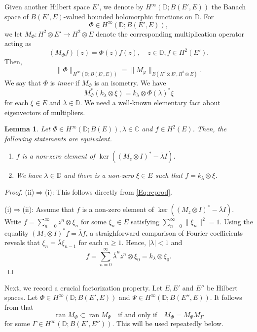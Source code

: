 \documentclass[10pt]{amsart}
\newcommand{\bC}{{\mathbb{C}}}
\newcommand{\bD}{{\mathbb{D}}}
\renewcommand{\phi}{\varphi}
\newcommand{\ol}{\overline}
\newcommand{\ran}{\operatorname{ran}}
\newtheorem{lemma}{Lemma}[section]
\theoremstyle{definition}
\begin{document}
Given another Hilbert space $E'$,  we denote by $H^\infty(\bD; B(E',E))$ the Banach space of $B(E',E)$-valued bounded holomorphic functions on $\bD$.  For $$\Phi\in H^\infty(\bD;B(E',E)),$$ we let $M_\Phi:H^2\otimes E'\to H^2 \otimes E$ denote the corresponding multiplication operator acting as
\[
(M_\Phi f)(z)=\Phi(z)f(z), \quad z\in \bD, f\in H^2(E').
\] 
Then, \[\|\Phi\|_{H^\infty(\bD;B(E',E))}=\|M_\phi\|_{B(H^2\otimes E',H^2\otimes E)}.\] We say that $\Phi$ is \emph{inner} if $M_\Phi$ is an isometry. We have
\begin{equation}\label{Eq:reprod}
M_\Phi^* (k_\lambda\otimes \xi)=k_\lambda \otimes \Phi(\lambda)^*\xi
\end{equation}
for each $ \xi\in E$ and $\lambda\in \bD$. We need a well-known elementary fact about eigenvectors of multipliers.

\begin{lemma}\label{L:eigenvector}
Let $\Phi\in H^\infty(\bD;B(E)),\lambda\in \bC$ and $f\in H^2(E)$. Then, the following statements are equivalent. 
\begin{enumerate}[{\rm (i)}]
\item $f$ is a non-zero element of $\ker ((M_z\otimes I)^*-\ol{\lambda}I)$.
\item We have $\lambda\in \bD$ and there is a non-zero $\xi\in E$ such that $f=k_\lambda\otimes \xi$.
\end{enumerate}
\end{lemma}
\begin{proof}
(ii)$\Rightarrow$(i): This follows directly from \eqref{Eq:reprod}. 

(i)$\Rightarrow$(ii): Assume that  $f$ is a non-zero element of $\ker ((M_z\otimes I)^*-\ol{\lambda}I)$. Write $f=\sum_{n=0}^\infty z^n \otimes \xi_n$ for some $\xi_n\in E$ satisfying $\sum_{n=0}^\infty \|\xi_n\|^2=1$. Using the equality $(M_z\otimes I)^* f=\ol{\lambda}f$, a straighforward comparison of Fourier coefficients reveals that $\xi_n=\ol{\lambda}\xi_{n-1}$ for each $n\geq 1$. Hence, $|\lambda|<1$ and
$$
f=\sum_{n=0}^\infty \ol{\lambda}^n z^n \otimes \xi_0=k_\lambda\otimes \xi_0.
$$
\end{proof}
Next, we record a crucial factorization property. Let $E,E'$ and $E''$ be Hilbert spaces. Let $\Phi\in H^\infty(\bD;B(E',E))$ and $\Psi\in H^\infty(\bD;B(E'',E))$. It follows from \cite[Theorem 8.57]{agler2002} that
\begin{equation}\label{Eq:Leech}
\ran M_\Phi\subset \ran M_\Psi \quad \text{if and only if} \quad M_\Phi=M_\Psi M_\Gamma
\end{equation}
for some $\Gamma\in H^\infty(\bD;B(E',E''))$. This will be used repeatedly below.
\end{document}
